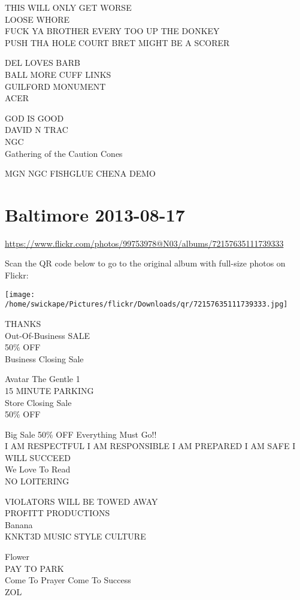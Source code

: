\documentclass[10pt,letterpaper]{article}
\begin{document}
THIS WILL ONLY GET WORSE\\
LOOSE WHORE\\
FUCK YA BROTHER EVERY TOO UP THE DONKEY\\
PUSH THA HOLE COURT BRET MIGHT BE A SCORER

DEL LOVES BARB\\
BALL MORE CUFF LINKS\\
GUILFORD MONUMENT\\
ACER

GOD IS GOOD\\
DAVID N TRAC\\
NGC\\
Gathering of the Caution Cones

MGN NGC FISHGLUE CHENA DEMO


\section*{Baltimore 2013-08-17}

\url{https://www.flickr.com/photos/99753978@N03/albums/72157635111739333}

Scan the QR code below to go to the original album with full-size photos on Flickr:

\texttt{[image: /home/swickape/Pictures/flickr/Downloads/qr/72157635111739333.jpg]}


THANKS\\
Out{-}Of{-}Business SALE\\
50\% OFF\\
Business Closing Sale

Avatar The Gentle 1\\
15 MINUTE PARKING\\
Store Closing Sale\\
50\% OFF

Big Sale 50\% OFF Everything Must Go!!\\
I AM RESPECTFUL I AM RESPONSIBLE I AM PREPARED I AM SAFE I WILL SUCCEED\\
We Love To Read\\
NO LOITERING

VIOLATORS WILL BE TOWED AWAY\\
PROFITT PRODUCTIONS\\
Banana\\
KNKT3D MUSIC STYLE CULTURE

Flower\\
PAY TO PARK\\
Come To Prayer Come To Success\\
ZOL
\end{document}

